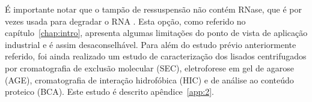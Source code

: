 É importante notar que o tampão de ressuspensão não contém RNase, que é por vezes usada para degradar o RNA \cite{qiagen}. Esta opção, como referido no capítulo~\ref{chap:intro}, apresenta algumas limitações do ponto de vista de aplicação industrial e é assim desaconselhável. Para além do estudo prévio anteriormente referido, foi ainda realizado um estudo de caracterização dos lisados centrifugados por cromatografia de exclusão molecular (SEC), eletroforese em gel de agarose (AGE), cromatografia de interação hidrofóbica (HIC) e de análise ao conteúdo proteico (BCA). Este estudo é descrito apêndice~\ref{app:2}.
